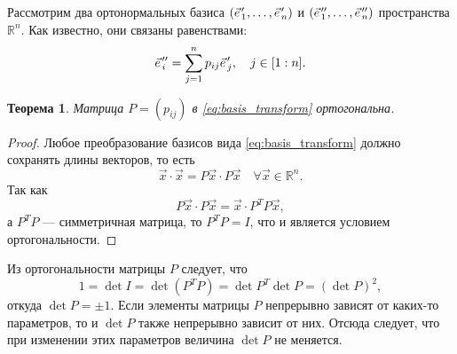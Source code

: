\documentclass{article}
\theoremstyle{definition}
\theoremstyle{plain}
\newtheorem{theorem}{Теорема}[section]
\theoremstyle{remark}
\numberwithin{equation}{section}
\newcommand{\wvec}[1]{\vec{#1}\mkern2mu\vphantom{#1}}
\newcommand{\pvec}[1]{\wvec{#1}'}
\newcommand{\ppvec}[1]{\wvec{#1}''}
\newcommand{\dotprod}[2]{#1 \cdot #2}
\begin{document}
Рассмотрим два ортонормальных базиса $(\pvec{e}_1, \dots, \pvec{e}_n)$ и
$(\ppvec{e}_1, \dots,  \ppvec{e}_n)$ пространства $\mathbb{R}^n$. Как
известно, они связаны равенствами:
\begin{equation}
  \label{eq:basis_transform}
  \ppvec{e}_i = \sum_{j=1}^n p_{ij} \pvec{e}_j, \quad j \in [1:n].
\end{equation}

\begin{theorem}
  Матрица $P = (p_{ij})$ в \autoref{eq:basis_transform} ортогональна.
\end{theorem}

\begin{proof}
  Любое преобразование базисов вида \ref{eq:basis_transform} должно сохранять
  длины векторов, то есть
  \begin{equation*}
    \dotprod{\vec{x}}{\vec{x}} = \dotprod{P \vec{x}}{P \vec{x}} \quad \forall
      \vec{x} \in \mathbb{R}^n .
  \end{equation*}
  Так как
  \begin{equation*}
    \dotprod{P \vec{x}}{P \vec{x}} = \dotprod{\vec{x}}{P^T P \vec{x}},
  \end{equation*}
  а $P^T P$ --- симметричная матрица, то $P^T P = I$, что и является условием
  ортогональности.
\end{proof}

Из ортогональности матрицы $P$ следует, что
\begin{equation*}
  1 = \det I = \det (P^T P) = \det P^T \det P = (\det P)^2,
\end{equation*}
откуда $\det P = \pm 1$. Если элементы матрицы $P$ непрерывно зависят от
каких-то параметров, то и $\det P$ также непрерывно зависит от них. Отсюда
следует, что при изменении этих параметров величина $\det P$ не меняется.
\end{document}
